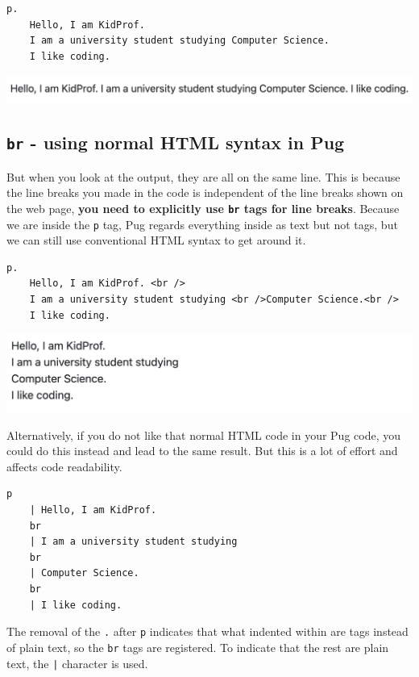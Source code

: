 \begin{lstlisting}[language=pug]
p.
	Hello, I am KidProf.
	I am a university student studying Computer Science.
	I like coding.
\end{lstlisting}

\includegraphics[width=15cm]{images/ch5-textinaline.png}

\subsection*{\texttt{br} - using normal HTML syntax in Pug}
\label{sec:br}

But when you look at the output, they are all on the same line. This is because the line breaks you made in the code is independent of the line breaks shown on the web page, \textbf{you need to explicitly use \texttt{br} tags for line breaks}. Because we are inside the \texttt{p} tag, Pug regards everything inside as text but not tags, but we can still use conventional HTML syntax to get around it.

\begin{lstlisting}[language=pug]
p.
	Hello, I am KidProf. <br />
	I am a university student studying <br />Computer Science.<br />
	I like coding.
\end{lstlisting}

\includegraphics[width=15cm]{images/ch5-textmultiplelines.png}

Alternatively, if you do not like that normal HTML code in your Pug code, you could do this instead and lead to the same result. But this is a lot of effort and affects code readability.

\begin{lstlisting}[language=pug]
p
	| Hello, I am KidProf.
	br
	| I am a university student studying
	br
	| Computer Science.
	br
	| I like coding.
\end{lstlisting}

The removal of the \texttt{.} after \texttt{p} indicates that what indented within are tags instead of plain text, so the \texttt{br} tags are registered. To indicate that the rest are plain text, the \texttt{|} character is used.
\vspace{6mm}


